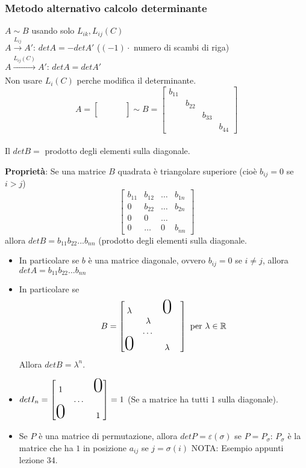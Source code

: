 \subsubsection{Metodo alternativo calcolo determinante}
$A\sim B$ usando solo $L_{ik},L_{ij}(C)$
\\$A\xrightarrow[]{L_{ij}}A'$: $detA=-detA'$ ($(-1)\cdot$ numero di scambi di riga)
\\$A\xrightarrow[]{L_{ij}(C)}A'$: $detA=detA'$
\\Non usare $L_i(C)$ perche modifica il determinante.
\[
  A=
\begin{bmatrix}
  &&&\\
  &&&\\
  &&&\\
  &&&
\end{bmatrix}
\sim B=
\begin{bmatrix}
  b_{11}&&&\\
  &b_{22}&&\\
  &&b_{33}&\\
  &&&b_{44}
\end{bmatrix}
\]
\\Il $detB=$ prodotto degli elementi sulla diagonale.

\textbf{Proprietà}: Se una matrice $B$ quadrata è triangolare superiore (cioè $b_{ij}=0$ se $i>j$)
\[
  \begin{bmatrix}
    b_{11} & b_{12} & \dots& b_{1n}\\
    0 & b_{22} & \dots & b_{2n}\\
    0 &0 & \dots \\
    0 & \dots & 0 & b_{nn}
    
  \end{bmatrix}
\]
allora $detB=b_{11}b_{22}...b_{nn}$ (prodotto degli elementi sulla diagonale.
\begin{itemize}
\item In particolare se $b$ è una matrice diagonale, ovvero $b_{ij}=0$ se $i\neq j$, allora $detA=b_{11}b_{22}...b_{nn}$
    \item In particolare se
  \[
    B=
    \begin{bmatrix}
      \lambda&&\text{\Huge0}\\
      &\lambda&&\\
      &\dots&&\\
      \text{\Huge0}&&\lambda
    \end{bmatrix}
    \text{ per }\lambda\in\mathbb{R}
    \]
    Allora $detB=\lambda^n$.

  \item $detI_n=
    \begin{bmatrix}
      1 &&\text{\Huge0}\\
      &\dots&\\
      \text{\Huge0}&&1
    \end{bmatrix}
=1$
(Se a matrice ha tutti $1$ sulla diagonale).

  \item Se $P$ è una matrice di permutazione, allora $detP=\varepsilon(\sigma)$ se $P=P_\sigma$: $P_\sigma$ è la matrice che ha $1$ in posizione $a_{ij}$ se $ j=\sigma(i)$
NOTA: Esempio appunti lezione 34.
\end{itemize}

